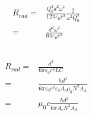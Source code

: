 \documentclass[10pt,fleqn]{article}
\newcommand{\eqar}[1]
{
  \begin{align*}
    #1
  \end{align*}
}
\begin{document}
\subsection{}
\eqar{
  R_{rad}=&\frac{Q_0^2d^2\omega^4}{12\pi\varepsilon_0c^3}\frac{2}{\omega^2 Q_0^2}\\
  =&\frac{d^2\omega^2}{6\pi\varepsilon_0c^3}
}
\subsection{}
\eqar{
  R_{rad}=&\frac{d^2}{6\pi\varepsilon_0c^3LC}\\
  =&\frac{hd^3}{6\pi\varepsilon_0c^3\varepsilon_0 A_c\mu_0N^2A_L}\\
  =&\mu_0 c\frac{hd^3}{6\pi A_c N^2A_L}
}
\section{}
\subsection{}
\subsection{}
\subsection{}
\subsection{}
\subsection{}
\subsection{}
\section{}
\subsection{}
\subsection{}
\subsection{}
\end{document}
